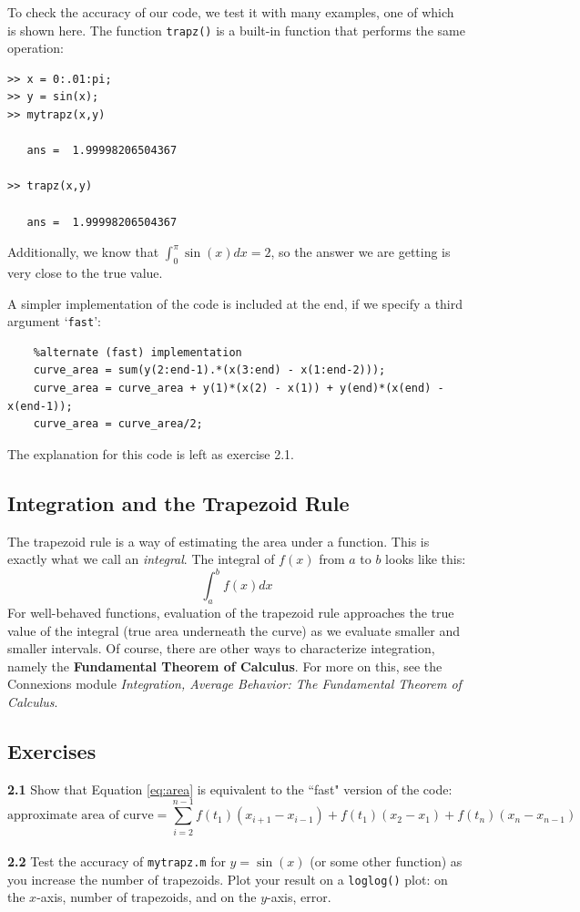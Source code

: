 \documentclass{article}
\begin{document}
To check the accuracy of our code, we test it with many examples, one of which is shown here.  The function {\tt trapz()} is a built-in function that performs the same operation:

\begin{verbatim}
>> x = 0:.01:pi;
>> y = sin(x);
>> mytrapz(x,y)

   ans =  1.99998206504367
   
>> trapz(x,y)

   ans =  1.99998206504367

\end{verbatim}

Additionally, we know that $\int_0^\pi \sin(x)dx=2$, so the answer we are getting is very close to the true value.

A simpler implementation of the code is included at the end, if we specify a third argument `{\tt fast}':

\begin{verbatim}
    %alternate (fast) implementation
    curve_area = sum(y(2:end-1).*(x(3:end) - x(1:end-2)));
    curve_area = curve_area + y(1)*(x(2) - x(1)) + y(end)*(x(end) - x(end-1));
    curve_area = curve_area/2;
\end{verbatim}

The explanation for this code is left as exercise 2.1.

\subsection{Integration and the Trapezoid Rule}
The trapezoid rule is a way of estimating the area under a function.  This is exactly what we call an {\it integral}.  The integral of $f(x)$ from $a$ to $b$ looks like this:
\[\int_a^b f(x) dx\]
For well-behaved functions, evaluation of the trapezoid rule approaches the true value of the integral (true area underneath the curve) as we evaluate smaller and smaller intervals.  Of course, there are other ways to characterize integration, namely the {\bf Fundamental Theorem of Calculus}.  For more on this, see the Connexions module {\it Integration, Average Behavior: The Fundamental Theorem of Calculus}.

\subsection{Exercises}
{\bf 2.1} Show that Equation \ref{eq:area} is equivalent to the ``fast" version of the code:
\[\text{approximate area of curve} =\sum_{i=2}^{n-1}f(t_1)(x_{i+1}-x_{i-1}) + f(t_1)(x_2-x_1)+ f(t_n)(x_n-x_{n-1})\]
\\
{\bf 2.2} Test the accuracy of {\tt mytrapz.m} for $y = \sin(x)$ (or some other function) as you increase the number of trapezoids.  Plot your result on a {\tt loglog()} plot: on the $x$-axis, number of trapezoids, and on the $y$-axis, error.
\end{document}
